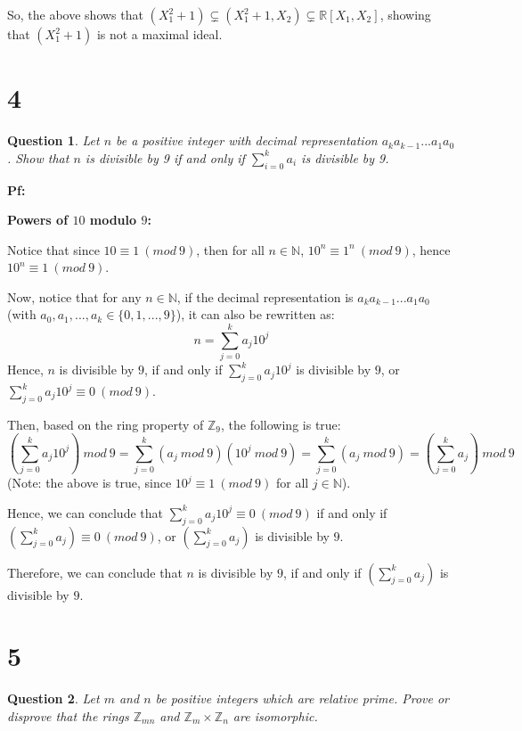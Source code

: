 \documentclass{article}
\newtheorem{question}{Question}
\begin{document}
\hfill

So, the above shows that $(X_1^2+1)\subsetneq (X_1^2+1,X_2)\subsetneq \mathbb{R}[X_1,X_2]$, showing that $(X_1^2+1)$ is not a maximal ideal.

\break

\section*{4}
\begin{myBox}[]{}
    \begin{question}
        Let $n$ be a positive integer with decimal representation $a_ka_{k-1}...a_1a_0$. Show that $n$ is
divisible by 9 if and only if $\sum_{i=0}^{k}a_i$ is divisible by 9.
    \end{question}
\end{myBox}

\textbf{Pf:}

\textbf{Powers of $10$ modulo $9$:}

Notice that since $10\equiv 1\ (mod\ 9)$, then for all $n\in\mathbb{N}$, $10^n\equiv 1^n\ (mod\ 9)$, hence $10^n\equiv 1\ (mod\ 9)$.

\hfill

Now, notice that for any $n\in\mathbb{N}$, if the decimal representation is $a_ka_{k-1}...a_1a_0$ (with $a_0,a_1,...,a_k\in \{0,1,...,9\}$), 
it can also be rewritten as:
$$n=\sum_{j=0}^{k}a_j10^j$$
Hence, $n$ is divisible by $9$, if and only if $\sum_{j=0}^{k}a_j10^j$ is divisible by $9$, or $\sum_{j=0}^{k}a_j10^j \equiv 0\ (mod\ 9)$.

Then, based on the ring property of $\mathbb{Z}_9$, the following is true:
$$\left(\sum_{j=0}^{k}a_j10^j\right)\ mod\ 9=\sum_{j=0}^{k}(a_j\ mod\ 9)(10^j\ mod\ 9)=\sum_{j=0}^{k}(a_j\ mod\ 9) = \left(\sum_{j=0}^{k}a_j\right)\ mod\ 9$$
(Note: the above is true, since $10^j\equiv 1\ (mod\ 9)$ for all $j\in\mathbb{N}$).

Hence, we can conclude that $\sum_{j=0}^{k}a_j10^j \equiv 0\ (mod\ 9)$ if and only if $\left(\sum_{j=0}^{k}a_j\right)\equiv 0\ (mod\ 9)$, or $\left(\sum_{j=0}^{k}a_j\right)$ is divisible by $9$.

Therefore, we can conclude that $n$ is divisible by $9$, if and only if  $\left(\sum_{j=0}^{k}a_j\right)$ is divisible by $9$.


\break

\section*{5}
\begin{myBox}[]{}
    \begin{question}
        Let $m$ and $n$ be positive integers which are relative prime. Prove or disprove that
        the rings $\mathbb{Z}_{mn}$ and $\mathbb{Z}_m\times \mathbb{Z}_n$ are isomorphic.
    \end{question}
\end{myBox}
\end{document}
